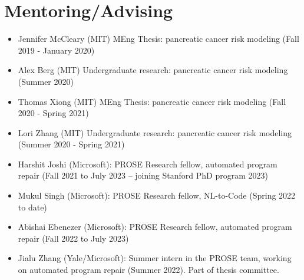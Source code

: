 \documentclass[11pt,a4paper,sans]{moderncv}
\begin{document}
\section{Mentoring/Advising}
\begin{itemize}
  \item Jennifer McCleary (MIT) MEng Thesis: pancreatic cancer risk modeling (Fall 2019 - January 2020)
  \item Alex Berg (MIT) Undergraduate research: pancreatic cancer risk modeling (Summer 2020)
  \item Thomas Xiong (MIT) MEng Thesis: pancreatic cancer risk modeling (Fall 2020 - Spring 2021)
  \item Lori Zhang (MIT) Undergraduate research: pancreatic cancer risk modeling (Summer 2020 - Spring 2021)
  \item Harshit Joshi (Microsoft): PROSE Research fellow, automated program repair (Fall 2021 to July 2023 -- joining Stanford PhD program 2023)
  \item Mukul Singh (Microsoft): PROSE Research fellow, NL-to-Code (Spring 2022 to date)
  \item Abishai Ebenezer (Microsoft): PROSE Research fellow, automated program repair (Fall 2022 to July 2023)
  \item Jialu Zhang (Yale/Microsoft): Summer intern in the PROSE team, working on automated program repair (Summer 2022). Part of thesis committee.
\end{itemize}


\nocite{*}


\end{document}
